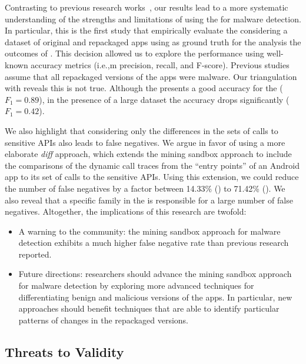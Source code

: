Contrasting to previous research works~\cite{DBLP:conf/wcre/BaoLL18,DBLP:conf/iceccs/LeB0GL18,DBLP:journals/jss/CostaMMSSBNR22},
our results 
lead to a more systematic understanding
of the strengths and limitations of using the \mas
for malware detection. In particular, this is the
first study that empirically evaluate the \mas
considering a dataset of original and repackaged
apps using as ground truth for the analysis the outcomes
of \vt. This decision allowed us to explore the
\mas performance using well-known accuracy metrics (i.e.,m precision, recall, and
F-score). Previous studies assume that all repackaged versions of the
apps were malware. Our triangulation with \vt reveals this is not true. Although
the \mas presents a good accuracy for the \cds ($F_1 = 0.89$), 
in the presence of a large dataset the \mas accuracy drops significantly ($F_1 = 0.42$). 

We also highlight that considering only the differences in the
sets of calls to sensitive APIs also leads to false negatives. We
argue in favor of using a more elaborate \emph{diff} approach, which
extends the mining sandbox approach to include the comparisons of
the dynamic call traces from the ``entry points'' of an Android app to its
set of calls to the sensitive APIs. Using this extension, we could reduce
the number of false negatives by a factor
between 14.33\% (\cds) to 71.42\% (\sds). We also reveal that
a specific family in the \cds is responsible for a large number of
false negatives. 
Altogether, the implications of this research are twofold:

\begin{itemize}
  \item A warning to the community: the mining sandbox approach for malware detection exhibits a much higher false negative rate  than previous research reported. 

  \item Future directions: researchers should advance the mining sandbox approach for malware detection by exploring more advanced techniques for differentiating
    benign and malicious versions of the apps. In particular, new approaches should benefit techniques that are able to identify particular patterns of changes
    in the repackaged versions. 
\end{itemize}  


\subsection{Threats to Validity}\label{sec:threats}

